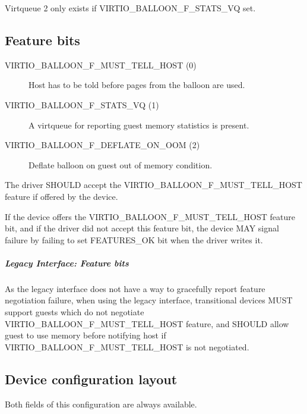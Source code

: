   Virtqueue 2 only exists if VIRTIO_BALLOON_F_STATS_VQ set.

\subsection{Feature bits}\label{sec:Device Types / Memory Balloon Device / Feature bits}
\begin{description}
\item[VIRTIO_BALLOON_F_MUST_TELL_HOST (0)] Host has to be told before
    pages from the balloon are used.

\item[VIRTIO_BALLOON_F_STATS_VQ (1)] A virtqueue for reporting guest
    memory statistics is present.
\item[VIRTIO_BALLOON_F_DEFLATE_ON_OOM (2) ] Deflate balloon on
    guest out of memory condition.

\end{description}

The driver SHOULD accept the VIRTIO_BALLOON_F_MUST_TELL_HOST
feature if offered by the device.

If the device offers the VIRTIO_BALLOON_F_MUST_TELL_HOST feature
bit, and if the driver did not accept this feature bit, the
device MAY signal failure by failing to set FEATURES_OK
 bit when the driver writes it.
\subparagraph{Legacy Interface: Feature bits}\label{sec:Device
Types / Memory Balloon Device / Feature bits / Legacy Interface:
Feature bits}
As the legacy interface does not have a way to gracefully report feature
negotiation failure, when using the legacy interface,
transitional devices MUST support guests which do not negotiate
VIRTIO_BALLOON_F_MUST_TELL_HOST feature, and SHOULD
allow guest to use memory before notifying host if
VIRTIO_BALLOON_F_MUST_TELL_HOST is not negotiated.

\subsection{Device configuration layout}\label{sec:Device Types / Memory Balloon Device / Device configuration layout}
  Both fields of this configuration
  are always available.

